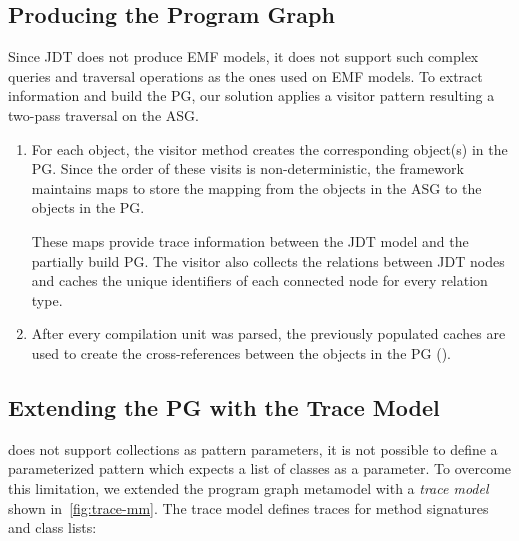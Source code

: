 \documentclass[submission,copyright,creativecommons]{eptcs}
\begin{document}
\subsection[Producing the Program Graph]{Producing the Program Graph\qquad{}}
Since JDT does not produce EMF models, it does not support such complex queries and traversal operations as the ones used on EMF models. To extract information and build the PG, our solution applies a visitor pattern resulting a two-pass traversal on the ASG.

\begin{enumerate}[noitemsep]
\item For each object, the visitor method creates the corresponding object(s) in the PG. Since the order of these visits is non-deterministic, the framework maintains maps to store the mapping from the objects in the ASG to the objects in the PG.

These maps provide trace information between the JDT model and the partially build PG. The visitor also collects the relations between JDT nodes and caches the unique identifiers of each connected node for every relation type. 

\item After every compilation unit was parsed, the previously populated caches are used to create the cross-references between the objects in the PG (\eg {}).
\end{enumerate}

\subsection[Extending the PG with the Trace Model]{Extending the PG with the Trace Model\qquad{}}


\noindent\eiq does not support collections as pattern parameters, \eg it is not possible to define a parameterized pattern which expects a list of classes as a parameter. To overcome this limitation, we extended the program graph metamodel with a \emph{trace model} shown in~\autoref{fig:trace-mm}. The trace model defines traces for method signatures and class lists:
\end{document}
